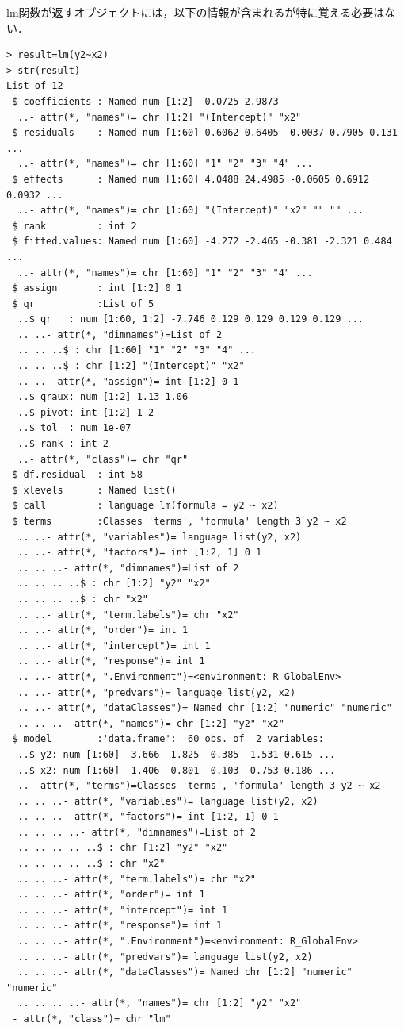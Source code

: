 \documentclass[a4paper,10pt,fleqn]{jarticle}
\begin{document}
lm関数が返すオブジェクトには，以下の情報が含まれるが特に覚える必要はない．
\begin{breakbox}
\begin{verbatim}
> result=lm(y2~x2)
> str(result)
List of 12
 $ coefficients : Named num [1:2] -0.0725 2.9873
  ..- attr(*, "names")= chr [1:2] "(Intercept)" "x2"
 $ residuals    : Named num [1:60] 0.6062 0.6405 -0.0037 0.7905 0.131 ...
  ..- attr(*, "names")= chr [1:60] "1" "2" "3" "4" ...
 $ effects      : Named num [1:60] 4.0488 24.4985 -0.0605 0.6912 0.0932 ...
  ..- attr(*, "names")= chr [1:60] "(Intercept)" "x2" "" "" ...
 $ rank         : int 2
 $ fitted.values: Named num [1:60] -4.272 -2.465 -0.381 -2.321 0.484 ...
  ..- attr(*, "names")= chr [1:60] "1" "2" "3" "4" ...
 $ assign       : int [1:2] 0 1
 $ qr           :List of 5
  ..$ qr   : num [1:60, 1:2] -7.746 0.129 0.129 0.129 0.129 ...
  .. ..- attr(*, "dimnames")=List of 2
  .. .. ..$ : chr [1:60] "1" "2" "3" "4" ...
  .. .. ..$ : chr [1:2] "(Intercept)" "x2"
  .. ..- attr(*, "assign")= int [1:2] 0 1
  ..$ qraux: num [1:2] 1.13 1.06
  ..$ pivot: int [1:2] 1 2
  ..$ tol  : num 1e-07
  ..$ rank : int 2
  ..- attr(*, "class")= chr "qr"
 $ df.residual  : int 58
 $ xlevels      : Named list()
 $ call         : language lm(formula = y2 ~ x2)
 $ terms        :Classes 'terms', 'formula' length 3 y2 ~ x2
  .. ..- attr(*, "variables")= language list(y2, x2)
  .. ..- attr(*, "factors")= int [1:2, 1] 0 1
  .. .. ..- attr(*, "dimnames")=List of 2
  .. .. .. ..$ : chr [1:2] "y2" "x2"
  .. .. .. ..$ : chr "x2"
  .. ..- attr(*, "term.labels")= chr "x2"
  .. ..- attr(*, "order")= int 1
  .. ..- attr(*, "intercept")= int 1
  .. ..- attr(*, "response")= int 1
  .. ..- attr(*, ".Environment")=<environment: R_GlobalEnv> 
  .. ..- attr(*, "predvars")= language list(y2, x2)
  .. ..- attr(*, "dataClasses")= Named chr [1:2] "numeric" "numeric"
  .. .. ..- attr(*, "names")= chr [1:2] "y2" "x2"
 $ model        :'data.frame':	60 obs. of  2 variables:
  ..$ y2: num [1:60] -3.666 -1.825 -0.385 -1.531 0.615 ...
  ..$ x2: num [1:60] -1.406 -0.801 -0.103 -0.753 0.186 ...
  ..- attr(*, "terms")=Classes 'terms', 'formula' length 3 y2 ~ x2
  .. .. ..- attr(*, "variables")= language list(y2, x2)
  .. .. ..- attr(*, "factors")= int [1:2, 1] 0 1
  .. .. .. ..- attr(*, "dimnames")=List of 2
  .. .. .. .. ..$ : chr [1:2] "y2" "x2"
  .. .. .. .. ..$ : chr "x2"
  .. .. ..- attr(*, "term.labels")= chr "x2"
  .. .. ..- attr(*, "order")= int 1
  .. .. ..- attr(*, "intercept")= int 1
  .. .. ..- attr(*, "response")= int 1
  .. .. ..- attr(*, ".Environment")=<environment: R_GlobalEnv> 
  .. .. ..- attr(*, "predvars")= language list(y2, x2)
  .. .. ..- attr(*, "dataClasses")= Named chr [1:2] "numeric" "numeric"
  .. .. .. ..- attr(*, "names")= chr [1:2] "y2" "x2"
 - attr(*, "class")= chr "lm"
\end{verbatim}
\end{breakbox}
\end{document}
